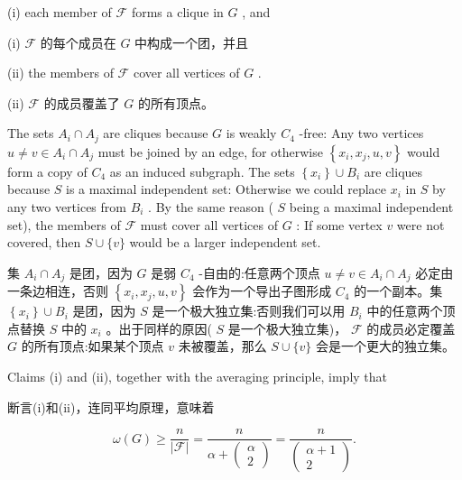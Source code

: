 \documentclass[10pt]{article}
\begin{document}
(i) each member of \(\mathcal{F}\) forms a clique in \(G\) , and

\begin{tcolorbox}\relax
(i) \(\mathcal{F}\) 的每个成员在 \(G\) 中构成一个团，并且
\end{tcolorbox}

(ii) the members of \(\mathcal{F}\) cover all vertices of \(G\) .

\begin{tcolorbox}\relax
(ii) \(\mathcal{F}\) 的成员覆盖了 \(G\) 的所有顶点。
\end{tcolorbox}

The sets \({A}_{i} \cap  {A}_{j}\) are cliques because \(G\) is weakly \({C}_{4}\) -free: Any two vertices \(u \neq  v \in  {A}_{i} \cap  {A}_{j}\) must be joined by an edge, for otherwise \(\left\{  {{x}_{i},{x}_{j},u,v}\right\}\) would form a copy of \({C}_{4}\) as an induced subgraph. The sets \(\left\{  {x}_{i}\right\}   \cup  {B}_{i}\) are cliques because \(S\) is a maximal independent set: Otherwise we could replace \({x}_{i}\) in \(S\) by any two vertices from \({B}_{i}\) . By the same reason ( \(S\) being a maximal independent set), the members of \(\mathcal{F}\) must cover all vertices of \(G\) : If some vertex \(v\) were not covered, then \(S \cup  \{ v\}\) would be a larger independent set.

\begin{tcolorbox}\relax
集 \({A}_{i} \cap  {A}_{j}\) 是团，因为 \(G\) 是弱 \({C}_{4}\) -自由的:任意两个顶点 \(u \neq  v \in  {A}_{i} \cap  {A}_{j}\) 必定由一条边相连，否则 \(\left\{  {{x}_{i},{x}_{j},u,v}\right\}\) 会作为一个导出子图形成 \({C}_{4}\) 的一个副本。集 \(\left\{  {x}_{i}\right\}   \cup  {B}_{i}\) 是团，因为 \(S\) 是一个极大独立集:否则我们可以用 \({B}_{i}\) 中的任意两个顶点替换 \(S\) 中的 \({x}_{i}\) 。出于同样的原因( \(S\) 是一个极大独立集)， \(\mathcal{F}\) 的成员必定覆盖 \(G\) 的所有顶点:如果某个顶点 \(v\) 未被覆盖，那么 \(S \cup  \{ v\}\) 会是一个更大的独立集。
\end{tcolorbox}

Claims (i) and (ii), together with the averaging principle, imply that

\begin{tcolorbox}\relax
断言(i)和(ii)，连同平均原理，意味着
\end{tcolorbox}

\[
\omega \left( G\right)  \geq  \frac{n}{\left| \mathcal{F}\right| } = \frac{n}{\alpha  + \left( \begin{array}{l} \alpha \\  2 \end{array}\right) } = \frac{n}{\left( \begin{matrix} \alpha  + 1 \\  2 \end{matrix}\right) }.
\]
\end{document}
